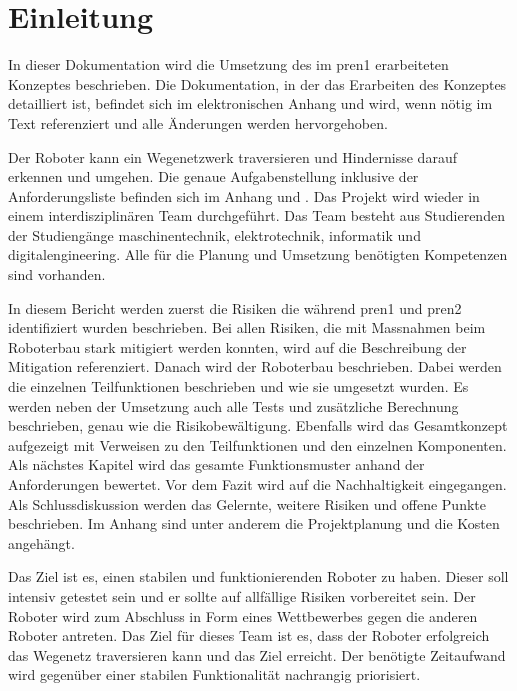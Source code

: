 \section{Einleitung}

In dieser Dokumentation wird die Umsetzung des im \acrfull{pren1} erarbeiteten Konzeptes beschrieben. 
Die Dokumentation, in der das Erarbeiten des Konzeptes detailliert ist, befindet sich im elektronischen Anhang und wird, wenn nötig im Text referenziert und alle Änderungen werden hervorgehoben.

Der Roboter kann ein Wegenetzwerk traversieren und Hindernisse darauf erkennen und umgehen. Die genaue Aufgabenstellung inklusive der Anforderungsliste befinden sich im Anhang  und . Das Projekt wird wieder in einem interdisziplinären Team durchgeführt. Das Team besteht aus Studierenden der Studiengänge \acrfull{maschinentechnik}, \acrfull{elektrotechnik}, \acrfull{informatik} und \acrfull{digitalengineering}. Alle für die Planung und Umsetzung benötigten Kompetenzen sind vorhanden.

In diesem Bericht werden zuerst die Risiken die während \acrshort{pren1} und \acrshort{pren2} identifiziert wurden beschrieben. Bei allen Risiken, die mit Massnahmen beim Roboterbau stark mitigiert werden konnten, wird auf die Beschreibung der Mitigation referenziert. Danach wird der Roboterbau beschrieben. Dabei werden die einzelnen Teilfunktionen beschrieben und wie sie umgesetzt wurden. Es werden neben der Umsetzung auch alle Tests und zusätzliche Berechnung beschrieben, genau wie die Risikobewältigung. Ebenfalls wird das Gesamtkonzept aufgezeigt mit Verweisen zu den Teilfunktionen und den einzelnen Komponenten. Als nächstes Kapitel wird das gesamte Funktionsmuster anhand der Anforderungen bewertet. Vor dem Fazit wird auf die Nachhaltigkeit eingegangen. Als Schlussdiskussion werden das Gelernte, weitere Risiken und offene Punkte beschrieben. Im Anhang sind unter anderem die Projektplanung und die Kosten angehängt.


Das Ziel ist es, einen stabilen und funktionierenden Roboter zu haben. Dieser soll intensiv getestet sein und er sollte auf allfällige Risiken vorbereitet sein. Der Roboter wird zum Abschluss in Form eines Wettbewerbes gegen die anderen Roboter antreten. Das Ziel für dieses Team ist es, dass der Roboter erfolgreich das Wegenetz traversieren kann und das Ziel erreicht. Der benötigte Zeitaufwand wird gegenüber einer stabilen Funktionalität nachrangig priorisiert.
